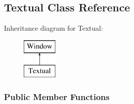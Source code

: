 \hypertarget{classTextual}{\subsection{Textual Class Reference}
\label{de/da3/classTextual}
}
Inheritance diagram for Textual\-:\begin{figure}[H]
\begin{center}
\leavevmode
\includegraphics[height=2.000000cm]{de/da3/classTextual}
\end{center}
\end{figure}
\subsubsection*{Public Member Functions}
